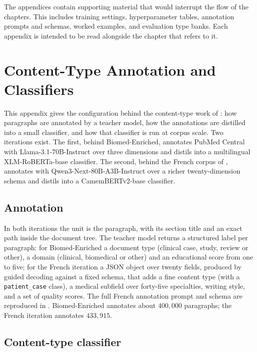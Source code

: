 
The appendices contain supporting material that would interrupt the flow of the
chapters. This includes training settings, hyperparameter tables, annotation
prompts and schemas, worked examples, and evaluation type banks. Each appendix
is intended to be read alongside the chapter that refers to it.

\chapter{Content-Type Annotation and Classifiers}
\label{app:content-types}

This appendix gives the configuration behind the content-type work of
: how paragraphs are annotated by a teacher model,
how the annotations are distilled into a small classifier, and how that classifier
is run at corpus scale. Two iterations exist. The first, behind Biomed-Enriched,
annotates PubMed Central with Llama-3.1-70B-Instruct over three dimensions and
distils into a multilingual XLM-RoBERTa-base classifier. The second, behind the
French corpus of , annotates with
Qwen3-Next-80B-A3B-Instruct over a richer twenty-dimension schema and distils
into a CamemBERTv2-base classifier.

\section{Annotation}

In both iterations the unit is the paragraph, with its section title and an exact
path inside the document tree. The teacher model returns a structured label per
paragraph: for Biomed-Enriched a document type (clinical case, study, review or
other), a domain (clinical, biomedical or other) and an educational score from one
to five; for the French iteration a JSON object over twenty fields, produced by
guided decoding against a fixed schema, that adds a fine content type (with a
\texttt{patient\_case} class), a medical subfield over forty-five specialties,
writing style, and a set of quality scores. The full French annotation prompt and
schema are reproduced in . Biomed-Enriched annotates about
$400{,}000$ paragraphs; the French iteration annotates $433{,}915$.

\section{Content-type classifier}

